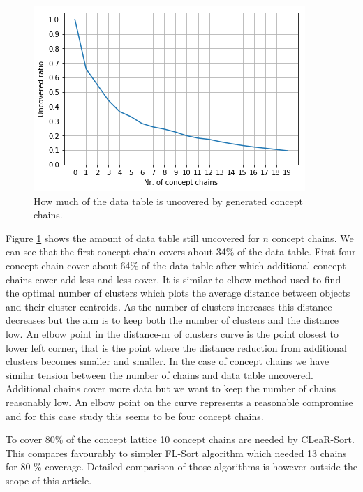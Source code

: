 \documentclass[acmconf,authordraft]{acmart}
\begin{document}
\begin{figure}[ht]
  \centering
   \includegraphics[width=\linewidth]{telia_ccc}
  \caption{How much of the data table is uncovered by generated concept chains.}
  \label{fig_cc_cover}
\end{figure}

Figure \ref{fig_cc_cover} shows the amount of data table still uncovered for $n$ concept chains.
We can see that the first concept chain covers about 34\% of the data table. First four concept chain cover about 64\% of the data table after which additional concept chains cover add less and less cover. It is similar to elbow method \cite{goutte_clustering_1999} used to find the optimal number of clusters which plots the average distance between objects and their cluster centroids. As the number of clusters increases this distance decreases but the aim is to keep both the number of clusters and the distance low. An elbow point in the distance-nr of clusters curve is the point closest to lower left corner, that is the point where the distance reduction from additional clusters becomes smaller and smaller. In the case of concept chains we have similar tension between the number of chains and data table uncovered. Additional chains cover more data but we want to keep the number of chains reasonably low. An elbow point on the curve represents a reasonable compromise and for this case study this seems to be four concept chains.

To cover 80\% of the concept lattice 10 concept chains are needed by CLeaR-Sort. This compares favourably to simpler FL-Sort algorithm \cite{torim_covering_2019} which needed 13 chains for 80 \% coverage. Detailed comparison of those algorithms is however outside the scope of this article.
\end{document}

